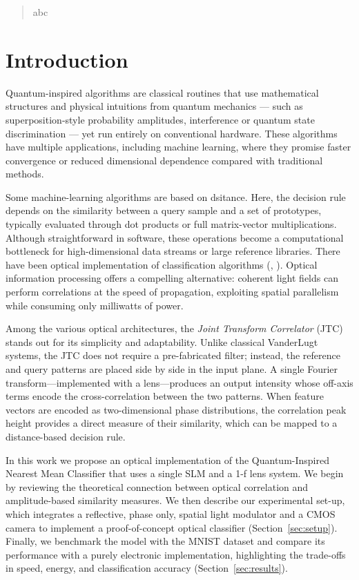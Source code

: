 \documentclass[twocolumn]{article} %
\begin{document}
\coverpage

\begin{abstract}
    abc
\end{abstract}


\section{Introduction}

Quantum-inspired algorithms are classical routines that use mathematical structures and physical intuitions from quantum mechanics — such as superposition-style probability amplitudes, interference or quantum state discrimination — yet run entirely on conventional hardware.  These algorithms have multiple applications, including machine learning, where they promise faster convergence or reduced dimensional dependence compared with traditional methods.

Some machine-learning algorithms are based on dsitance.  Here, the decision rule depends on the similarity between a query sample and a set of prototypes, typically evaluated through dot products or full matrix-vector multiplications.  Although straightforward in software, these operations become a computational bottleneck for high-dimensional data streams or large reference libraries.  There have been optical implementation of classification algorithms (\cite{Psaltis1984}, \cite{Neifeld1993}). Optical information processing offers a compelling alternative: coherent light fields can perform correlations at the speed of propagation, exploiting spatial parallelism while consuming only milliwatts of power.



Among the various optical architectures, the \emph{Joint Transform Correlator} (JTC) stands out for its simplicity and adaptability.  Unlike classical VanderLugt systems, the JTC does not require a pre-fabricated filter; instead, the reference and query patterns are placed side by side in the input plane.  A single Fourier transform—implemented with a lens—produces an output intensity whose off-axis terms encode the cross-correlation between the two patterns.  When feature vectors are encoded as two-dimensional phase distributions, the correlation peak height provides a direct measure of their similarity, which can be mapped to a distance-based decision rule.

In this work we propose an optical implementation of the Quantum-Inspired Nearest Mean Classifier that uses a single SLM and a 1-f lens system.  We begin by reviewing the theoretical connection between optical correlation and amplitude-based similarity measures. We then describe our experimental set-up, which integrates a reflective, phase only, spatial light modulator and a CMOS camera to implement a proof-of-concept optical classifier (Section~\ref{sec:setup}).  Finally, we benchmark the model with the MNIST dataset and compare its performance with a purely electronic implementation, highlighting the trade-offs in speed, energy, and classification accuracy (Section~\ref{sec:results}).
\end{document}

